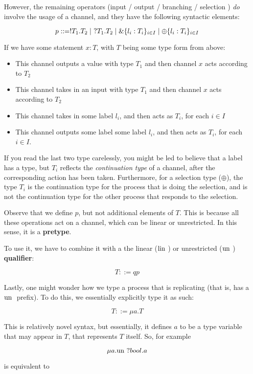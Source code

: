 However, the remaining operators (input / output / branching / selection ) \textit{do} involve the usage of a channel, and they have the following syntactic elements:

$$
p ::= !T_1.T_2 \mid \ ?T_1.T_2 \mid \&\{l_i : T_i\}_{i \in I} \mid \oplus \{l_i : T_i\}_{i \in I}
$$

If we have some statement $x : T$, with $T$ being some type form from above:
\begin{itemize}
    \item This channel outputs a value with type $T_1$ and then channel $x$ acts according to $T_2$
    \item This channel takes in an input with type $T_1$ and then channel $x$ acts according to $T_2$
    \item This channel takes in some label $l_i$, and then acts as $T_i$, for each $i \in I$
    \item This channel outputs some label some label $l_i$, and then acts as $T_i$, for each $i \in I$.
\end{itemize}

If you read the last two type carelessly, you might be led to believe that a label has a type, but $T_i$ reflects the \textit{continuation type} of a channel, after the corresponding action has been taken. Furthermore, for a selection type ($\oplus$), the type $T_i$ is the continuation type for the process that is doing the selection, and is not the continuation type for the other process that responds to the selection.

Observe that we define $p$, but not additional elements of $T$. This is because all these operations act on a channel, which can be linear  or unrestricted. In this sense, it is a \textbf{pretype}.

To use it, we have to combine it with a the linear ($\text{lin }$) or unrestricted ($\text{un }$) \textbf{qualifier}:

$$
T ::= q p
$$

Lastly, one might wonder how we type a process that is replicating (that is, has a $\text{un }$ prefix). To do this, we essentially explicitly type it as such:

$$
T ::= \mu a.T
$$

This is relatively novel syntax, but essentially, it defines $a$ to be a type variable that may appear in $T$, that represents $T$ itself. So, for example

$$
\mu a. \text{un } ? bool . a
$$

is equivalent to

